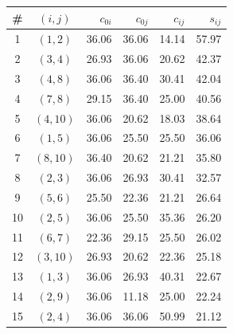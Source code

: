 \begin{tabular}{ccrrrr}
\toprule
\# & $(i,j)$ & $c_{0i}$ & $c_{0j}$ & $c_{ij}$ & $s_{ij}$ \\
\midrule
1 & $(1,2)$ & 36.06 & 36.06 & 14.14 & 57.97 \\
2 & $(3,4)$ & 26.93 & 36.06 & 20.62 & 42.37 \\
3 & $(4,8)$ & 36.06 & 36.40 & 30.41 & 42.04 \\
4 & $(7,8)$ & 29.15 & 36.40 & 25.00 & 40.56 \\
5 & $(4,10)$ & 36.06 & 20.62 & 18.03 & 38.64 \\
6 & $(1,5)$ & 36.06 & 25.50 & 25.50 & 36.06 \\
7 & $(8,10)$ & 36.40 & 20.62 & 21.21 & 35.80 \\
8 & $(2,3)$ & 36.06 & 26.93 & 30.41 & 32.57 \\
9 & $(5,6)$ & 25.50 & 22.36 & 21.21 & 26.64 \\
10 & $(2,5)$ & 36.06 & 25.50 & 35.36 & 26.20 \\
11 & $(6,7)$ & 22.36 & 29.15 & 25.50 & 26.02 \\
12 & $(3,10)$ & 26.93 & 20.62 & 22.36 & 25.18 \\
13 & $(1,3)$ & 36.06 & 26.93 & 40.31 & 22.67 \\
14 & $(2,9)$ & 36.06 & 11.18 & 25.00 & 22.24 \\
15 & $(2,4)$ & 36.06 & 36.06 & 50.99 & 21.12 \\
\bottomrule
\end{tabular}
